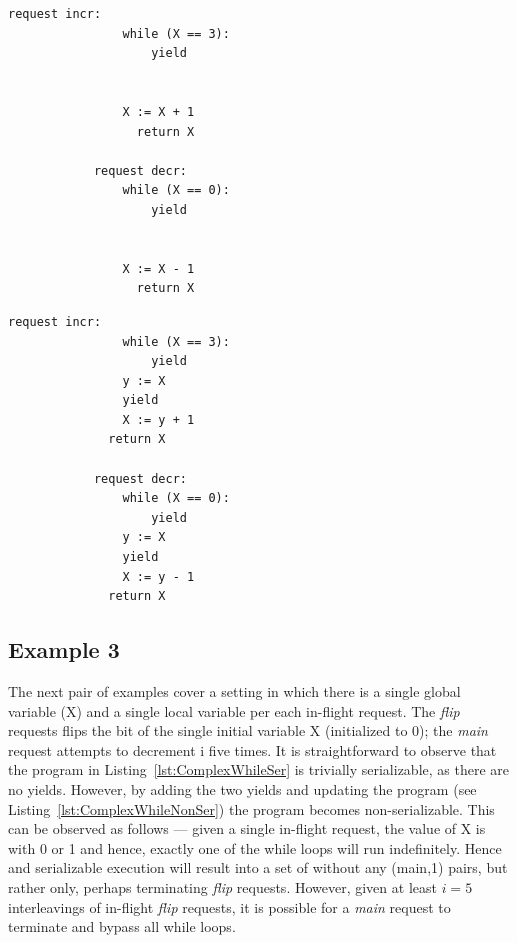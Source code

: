
\noindent
\begin{minipage}[t]{0.45\textwidth}
	\begin{lstlisting}[caption={Fred (serializable)},
		label={lst:FredSer}]
			request incr: 
			    while (X == 3):
			        yield
			        
			        
			    X := X + 1
				  return X		
			
			request decr: 
			    while (X == 0): 
			        yield
			        
			        
			    X := X - 1
				  return X
		\end{lstlisting}
\end{minipage}
\hfill
\begin{minipage}[t]{0.45\textwidth}
	\begin{lstlisting}[caption={Fred2 (not serializable)},
		label={lst:FredNonSer}]
			request incr:
			    while (X == 3):
			        yield
			    y := X
			    yield
			    X := y + 1
		      return X		
			
			request decr: 
			    while (X == 0):
			        yield
			    y := X
			    yield
			    X := y - 1
		      return X
		\end{lstlisting}
\end{minipage}
	
\subsection{Example 3}

The next pair of examples cover a setting in which there is a single global variable (X) and a single local variable per each in-flight request. The \textit{flip} requests flips the bit of the single initial variable X (initialized to 0); the \textit{main} request attempts to decrement i five times.
%
It is straightforward to observe that the program in Listing~\ref{lst:ComplexWhileSer} is trivially serializable, as there are no yields.
%
However, by adding the two yields and updating the program (see Listing~\ref{lst:ComplexWhileNonSer}) the program becomes non-serializable. This can be observed as follows --- given a single in-flight request, the value of X is with 0 or 1 and hence, exactly one of the while loops will run indefinitely. Hence and serializable execution will result into a set of without any (main,1) pairs, but rather only, perhaps terminating \textit{flip} requests.
%
However, given at least $i=5$ interleavings of in-flight \textit{flip} requests, it is possible for a \textit{main} request to terminate and bypass all while loops.


